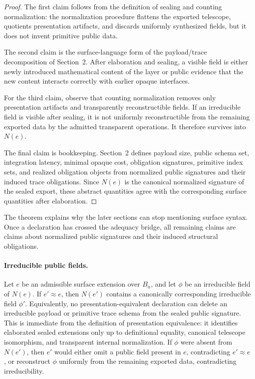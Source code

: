 \documentclass{lmcs}
\begin{document}
\begin{proof}
The first claim follows from the definition of sealing and counting normalization: the
normalization procedure flattens the exported telescope, quotients presentation artifacts, and
discards uniformly synthesized fields, but it does not invent primitive public data.

The second claim is the surface-language form of the payload/trace decomposition of
Section~2.  After elaboration and sealing, a visible field is either newly introduced
mathematical content of the layer or public evidence that the new content interacts correctly
with earlier opaque interfaces.

For the third claim, observe that counting normalization removes only presentation artifacts
and transparently reconstructible fields.  If an irreducible field is visible after sealing, it is
not uniformly reconstructible from the remaining exported data by the admitted transparent
operations.  It therefore survives into \(N(e)\).

The final claim is bookkeeping.  Section~2 defines payload size, public schema set,
integration latency, minimal opaque cost, obligation signatures, primitive index sets, and
realized obligation objects from normalized public signatures and their induced trace
obligations.  Since \(N(e)\) is the canonical normalized signature of the sealed export, these
abstract quantities agree with the corresponding surface quantities after elaboration.
\end{proof}

The theorem explains why the later sections can stop mentioning surface syntax.  Once a
declaration has crossed the adequacy bridge, all remaining claims are claims about normalized
public signatures and their induced structural obligations.

\paragraph{Irreducible public fields.}
Let \(e\) be an admissible surface extension over \(B_n\), and let \(\phi\) be an irreducible
field of \(N(e)\).  If \(e'\approx e\), then \(N(e')\) contains a canonically corresponding
irreducible field \(\phi'\).  Equivalently, no presentation-equivalent declaration can delete an
irreducible payload or primitive trace schema from the sealed public signature.
This is immediate from the definition of presentation equivalence: it identifies elaborated
sealed extensions only up to definitional equality, canonical telescope isomorphism, and
transparent internal normalization.  If \(\phi\) were absent from \(N(e')\), then \(e'\) would
either omit a public field present in \(e\), contradicting \(e'\approx e\), or reconstruct
\(\phi\) uniformly from the remaining exported data, contradicting irreducibility.
\end{document}
